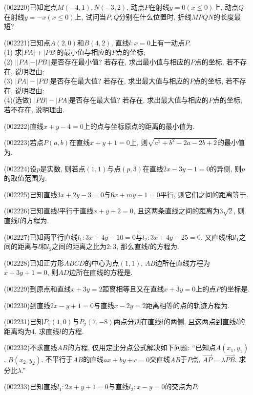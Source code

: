\item (002220)已知定点$M(-4,1), N(-3,2)$, 动点$P$在射线$y=0(x\leq 0)$上,
动点$Q$在射线$y=-x(x\leq 0)$上, 试问当$P,Q$分别在什么位置时, 折线$MPQN$的长度最短?
\item (002221)已知点$A(2,0)$和$B(4,2)$, 直线$l: x=0$上有一动点$P$.\\ 
(1) 求$|PA|+|PB|$的最小值与相应的$P$点的坐标;\\ 
(2) $||PA|-|PB||$是否存在最小值? 若存在, 求出最小值与相应的$P$点的坐标, 若不存在, 说明理由;\\ 
(3) $|PA|-|PB|$是否存在最大值? 若存在, 求出最大值与相应的$P$点的坐标, 若不存在, 说明理由;\\ 
(4)(选做) $|PB|-|PA|$是否存在最大值? 若存在, 求出最大值与相应的$P$点的坐标, 若不存在, 说明理由.
\item (002222)直线$x+y-4=0$上的点与坐标原点的距离的最小值为.
\item (002223)若点$P(a,b)$在直线$x+y+1=0$上, 则$\sqrt{a^2+b^2-2a-2b+2}$的最小值为.
\item (002224)设$p$是实数, 则若点$(1,1)$与点$(p,3)$在直线$2x-3y-1=0$的异侧, 则$p$的取值范围为.
\item (002225)已知直线$3x+2y-3=0$与$6x+my+1=0$平行, 则它们之间的距离等于.
\item (002226)已知直线$l$平行于直线$x+y+2=0$, 且这两条直线之间的距离为$3\sqrt{2}$, 则直线$l$的方程为.
\item (002227)已知两平行直线$l_1:3x+4y-10=0$与$l_2:3x+4y-25=0$. 又直线$l$和$l_1$之间的距离与$l$和$l_2$之间的距离之比为$2:3$, 那么直线$l$的方程为.
\item (002228)已知正方形$ABCD$的中心为点$(1,1)$, $AB$边所在直线方程为$x+3y+1=0$, 则$AD$边所在直线的方程是.
\item (002229)到原点和直线$x+3y=2$距离相等且又在直线$x+3y=0$上的点$P$的坐标是.
\item (002230)到直线$2x-y+1=0$与直线$x-2y=2$距离相等的点的轨迹方程为.
\item (002231)已知$P_1(1,0)$与$P_2(7,-8)$两点分别在直线$l$的两侧, 且这两点到直线$l$的距离均为$4$, 求直线$l$的方程.
\item (002232)不求直线$AB$的方程, 仅用定比分点公式解决如下问题: ``已知点$A(x_1,y_1)$, $B(x_2,y_2)$, 不平行于$AB$的直线$ax+by+c=0$交直线$AB$于$P$点, $\overrightarrow{AP}=\lambda\overrightarrow{PB}$, 求分比$\lambda$.''
\item (002233)已知直线${{l}_{1}}:2x+y+1=0$与直线${{l}_{2}}:x-y=0$的交点为$P$.\\ 
